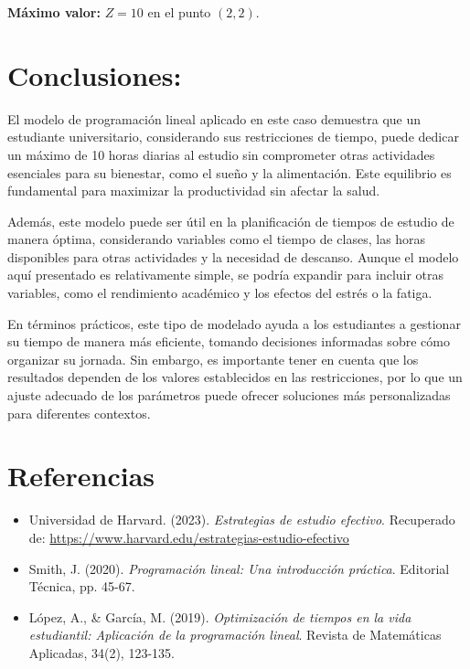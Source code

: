 \documentclass[12pt]{article}
\begin{document}
\textbf{Máximo valor:} $Z = \boxed{10}$ en el punto $(2,2)$.

\section*{Conclusiones:}

El modelo de programación lineal aplicado en este caso demuestra que un estudiante universitario, considerando sus restricciones de tiempo, puede dedicar un máximo de 10 horas diarias al estudio sin comprometer otras actividades esenciales para su bienestar, como el sueño y la alimentación. Este equilibrio es fundamental para maximizar la productividad sin afectar la salud.

Además, este modelo puede ser útil en la planificación de tiempos de estudio de manera óptima, considerando variables como el tiempo de clases, las horas disponibles para otras actividades y la necesidad de descanso. Aunque el modelo aquí presentado es relativamente simple, se podría expandir para incluir otras variables, como el rendimiento académico y los efectos del estrés o la fatiga.

En términos prácticos, este tipo de modelado ayuda a los estudiantes a gestionar su tiempo de manera más eficiente, tomando decisiones informadas sobre cómo organizar su jornada. Sin embargo, es importante tener en cuenta que los resultados dependen de los valores establecidos en las restricciones, por lo que un ajuste adecuado de los parámetros puede ofrecer soluciones más personalizadas para diferentes contextos.

\section*{Referencias}

\begin{itemize}
    \item Universidad de Harvard. (2023). \textit{Estrategias de estudio efectivo}. Recuperado de: \url{https://www.harvard.edu/estrategias-estudio-efectivo}
    \item Smith, J. (2020). \textit{Programación lineal: Una introducción práctica}. Editorial Técnica, pp. 45-67.
    \item López, A., & García, M. (2019). \textit{Optimización de tiempos en la vida estudiantil: Aplicación de la programación lineal}. Revista de Matemáticas Aplicadas, 34(2), 123-135.
\end{itemize}
\end{document}
